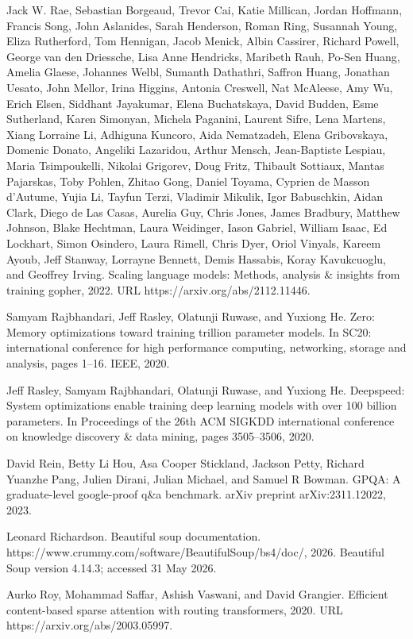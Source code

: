 Jack W. Rae, Sebastian Borgeaud, Trevor Cai, Katie Millican, Jordan
Hoffmann, Francis Song, John Aslanides, Sarah Henderson, Roman Ring,
Susannah Young, Eliza Rutherford, Tom Hennigan, Jacob Menick, Albin
Cassirer, Richard Powell, George van den Driessche, Lisa Anne Hendricks,
Maribeth Rauh, Po-Sen Huang, Amelia Glaese, Johannes Welbl, Sumanth
Dathathri, Saffron Huang, Jonathan Uesato, John Mellor, Irina Higgins,
Antonia Creswell, Nat McAleese, Amy Wu, Erich Elsen, Siddhant Jayakumar,
Elena Buchatskaya, David Budden, Esme Sutherland, Karen Simonyan,
Michela Paganini, Laurent Sifre, Lena Martens, Xiang Lorraine Li,
Adhiguna Kuncoro, Aida Nematzadeh, Elena Gribovskaya, Domenic Donato,
Angeliki Lazaridou, Arthur Mensch, Jean-Baptiste Lespiau, Maria
Tsimpoukelli, Nikolai Grigorev, Doug Fritz, Thibault Sottiaux, Mantas
Pajarskas, Toby Pohlen, Zhitao Gong, Daniel Toyama, Cyprien de Masson
d'Autume, Yujia Li, Tayfun Terzi, Vladimir Mikulik, Igor Babuschkin,
Aidan Clark, Diego de Las Casas, Aurelia Guy, Chris Jones, James
Bradbury, Matthew Johnson, Blake Hechtman, Laura Weidinger, Iason
Gabriel, William Isaac, Ed Lockhart, Simon Osindero, Laura Rimell, Chris
Dyer, Oriol Vinyals, Kareem Ayoub, Jeff Stanway, Lorrayne Bennett, Demis
Hassabis, Koray Kavukcuoglu, and Geoffrey Irving. Scaling language
models: Methods, analysis \& insights from training gopher, 2022. URL
https://arxiv.org/abs/2112.11446.

Samyam Rajbhandari, Jeff Rasley, Olatunji Ruwase, and Yuxiong He. Zero:
Memory optimizations toward training trillion parameter models. In SC20:
international conference for high performance computing, networking,
storage and analysis, pages 1--16. IEEE, 2020.

Jeff Rasley, Samyam Rajbhandari, Olatunji Ruwase, and Yuxiong He.
Deepspeed: System optimizations enable training deep learning models
with over 100 billion parameters. In Proceedings of the 26th ACM SIGKDD
international conference on knowledge discovery \& data mining, pages
3505--3506, 2020.

David Rein, Betty Li Hou, Asa Cooper Stickland, Jackson Petty, Richard
Yuanzhe Pang, Julien Dirani, Julian Michael, and Samuel R Bowman. GPQA:
A graduate-level google-proof q\&a benchmark. arXiv preprint
arXiv:2311.12022, 2023.

Leonard Richardson. Beautiful soup documentation.
https://www.crummy.com/software/BeautifulSoup/bs4/doc/, 2026. Beautiful
Soup version 4.14.3; accessed 31 May 2026.

Aurko Roy, Mohammad Saffar, Ashish Vaswani, and David Grangier. Efficient
content-based sparse attention with routing transformers, 2020. URL
https://arxiv.org/abs/2003.05997.

